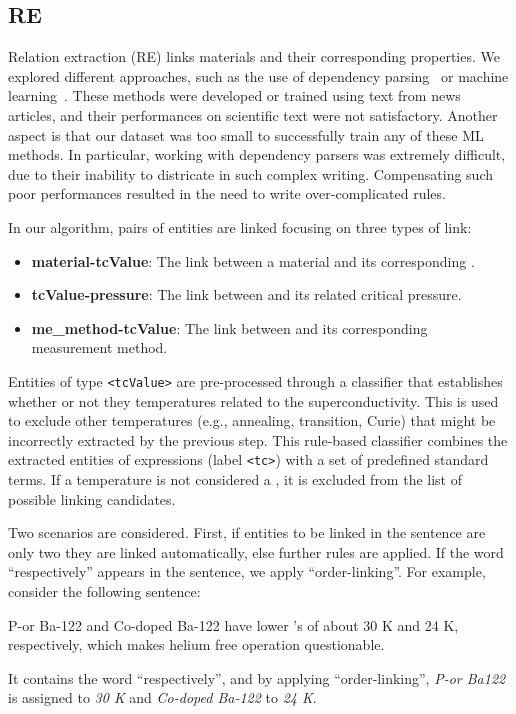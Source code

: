 \subsection{RE}
\label{subsec:re-solution}
\label{subsubsec:linking}

Relation extraction (RE) links materials and their corresponding properties. 
We explored different approaches, such as the use of dependency parsing~\cite{yoshikawa:2017acl, Tiktinsky2020pyBARTES, swayamdipta:17, zhou-zhao-2019-head} or machine learning~\cite{lin2016neural,hariharan2019relation}. 
These methods were developed or trained using text from news articles, and their performances on scientific text were not satisfactory. 
Another aspect is that our dataset was too small to successfully train any of these ML methods. 
In particular, working with dependency parsers was extremely difficult, due to their inability to districate in such complex writing. 
Compensating such poor performances resulted in the need to write over-complicated rules. 


In our algorithm, pairs of entities are linked focusing on three types of link:
\begin{itemize}
    \item \textbf{material-tcValue}: The link between a material and its corresponding \tc.
    \item \textbf{tcValue-pressure}: The link between \tc and its related critical pressure.
    \item \textbf{me\_method-tcValue}: The link between \tc and its corresponding measurement method.
\end{itemize}

Entities of type \texttt{<tcValue>} are pre-processed through a classifier that establishes whether or not they temperatures related to the superconductivity. This is used to exclude other temperatures (e.g., annealing, transition, Curie) that might be incorrectly extracted by the previous step.
This rule-based classifier combines the extracted entities of \tc expressions (label \texttt{<tc>}) with a set of predefined standard terms.
If a temperature is not considered a \tc, it is excluded from the list of possible linking candidates.

Two scenarios are considered. First, if entities to be linked in the sentence are only two they are linked automatically, else further rules are applied. 
If the word ``respectively'' appears in the sentence, we apply ``order-linking''. 
For example, consider the following sentence:
\begin{displayquote}
    P-or Ba-122  and Co-doped Ba-122 have lower \tc's of about 30 K and 24 K, respectively, which makes helium free operation questionable.
\end{displayquote}
It contains the word ``respectively'', and by applying ``order-linking'', \textit{P-or Ba122} is assigned to \textit{30 K} and \textit{Co-doped Ba-122} to \textit{24 K}.


